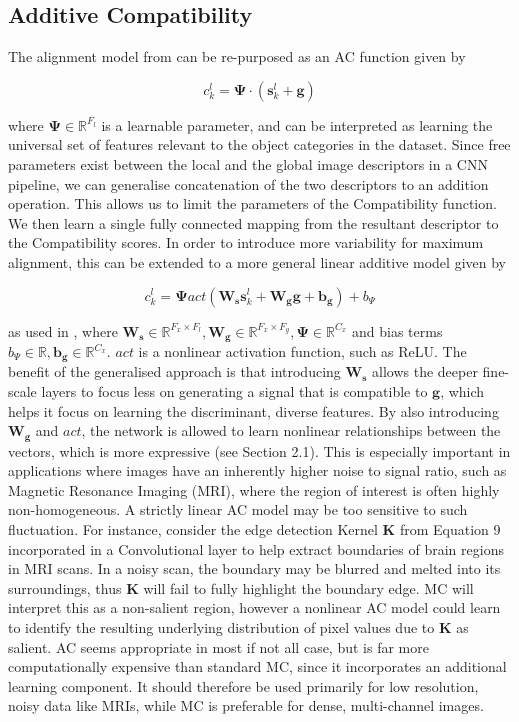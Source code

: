 \documentclass[11pt]{article}
\begin{document}
\subsection{Additive Compatibility}

The alignment model from \cite{bahdanau} can be re-purposed as an AC function given by

\begin{equation}
c^{l}_{k} = \bm{\Psi} \cdot (\bm{s}^{l}_{k} + \bm{g})
\end{equation}

where $\bm{\Psi} \in \mathbb{R}^{F_l}$ is a learnable parameter, and can be interpreted as learning the universal set of features relevant to the object categories in the dataset. Since free parameters exist between the local and the global image descriptors in a CNN pipeline, we can generalise concatenation of the two descriptors to an addition operation. This allows us to limit the parameters of the Compatibility function. We then learn a single fully connected mapping from the resultant descriptor to the Compatibility scores. In order to introduce more variability for maximum alignment, this can be extended to a more general linear additive model given by 

\begin{equation}
c^{l}_{k} = \bm{\Psi}act(\bm{W_s}\bm{s}^{l}_{k} + \bm{W_g}\bm{g} + \bm{b_g}) + b_\Psi
\end{equation}

as used in \cite{schlemper1}, where $\bm{W_s} \in \mathbb{R}^{F_{x} \times F_{l}}, \bm{W_g} \in \mathbb{R}^{F_{x} \times F_{g}}, \bm{\Psi} \in \mathbb{R}^{C_x}$ and bias terms $b_\Psi \in \mathbb{R}, \bm{b_g} \in \mathbb{R}^{C_x}$. $act$ is a nonlinear activation function, such as ReLU. The benefit of the generalised approach is that introducing $\bm{W_s}$ allows the deeper fine-scale layers to focus less on generating a signal that is compatible to $\bm{g}$, which helps it focus on learning the discriminant, diverse features. By also introducing $\bm{W_g}$ and $act$, the network is allowed to learn nonlinear relationships between the vectors, which is more expressive (see Section 2.1). This is especially important in applications where images have an inherently higher noise to signal ratio, such as Magnetic Resonance Imaging (MRI), where the region of interest is often highly non-homogeneous. A strictly linear AC model may be too sensitive to such fluctuation. For instance, consider the edge detection Kernel $\bm{K}$ from Equation 9 incorporated in a Convolutional layer to help extract boundaries of brain regions in MRI scans. In a noisy scan, the boundary may be blurred and melted into its surroundings, thus $\bm{K}$ will fail to fully highlight the boundary edge. MC will interpret this as a non-salient region, however a nonlinear AC model could learn to identify the resulting underlying distribution of pixel values due to $\bm{K}$ as salient. AC seems appropriate in most if not all case, but is far more computationally expensive than standard MC, since it incorporates an additional learning component. It should therefore be used primarily for low resolution, noisy data like MRIs, while MC is preferable for dense, multi-channel images. \newline
\end{document}
